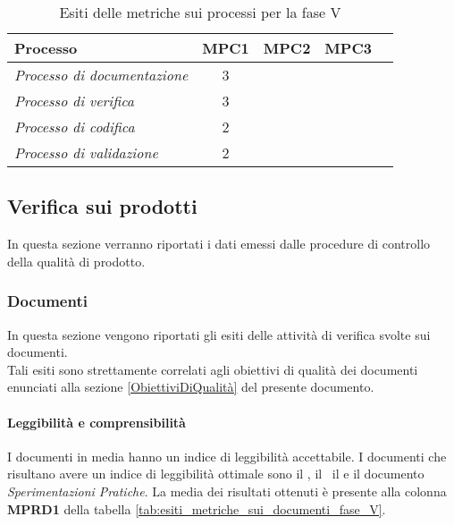 \documentclass[../PianoDiQualifica.tex]{subfiles}
\begin{document}
\begin{appendices}
			\begin{table}[H]
				\centering
				\begin{tabular}{l * {4}{c}}
					\toprule
					\textbf{Processo} & \textbf{MPC1} & \textbf{MPC2} & \textbf{MPC3} \\
					\midrule
					\textit{Processo di documentazione} & 3 & \color{dkgreen}{0\%} &  \color{dkgreen}{0\%} \\
					\textit{Processo di verifica} & 3 & \color{dkgreen}{0\%} &  \color{dkgreen}{0\%} \\
					\textit{Processo di codifica} & 2 & \color{dkgreen}{0\%} &  \color{red}{+32\%} \\
					\textit{Processo di validazione} & 2 & \color{dkgreen}{0\%} &  \color{dkgreen}{0\%} \\
					\bottomrule
				\end{tabular}
				\caption{Esiti delle metriche sui processi per la fase V}
				\label{tab:esiti_metriche_processi_fase_V}
			\end{table}
			
			
	\subsection{Verifica sui prodotti}
	In questa sezione verranno riportati i dati emessi dalle procedure di controllo della qualità di prodotto\g.
	
		\subsubsection{Documenti}
		In questa sezione vengono riportati gli esiti delle attività di verifica svolte sui documenti.\\
		Tali esiti sono strettamente correlati agli obiettivi di qualità dei documenti enunciati alla sezione \ref{ObiettiviDiQualità} del presente documento.
			
			\paragraph{Leggibilità e comprensibilità}
			I documenti in media hanno un indice di leggibilità accettabile. I documenti che risultano avere un indice di leggibilità ottimale sono il \glossario, il \manualeutente\, il \manualesviluppatore e il documento \textit{Sperimentazioni Pratiche}.
			La media dei risultati ottenuti è presente alla colonna \textbf{MPRD1} della tabella \ref{tab:esiti_metriche_sui_documenti_fase_V}. 
			

\end{appendices}
\end{document}
